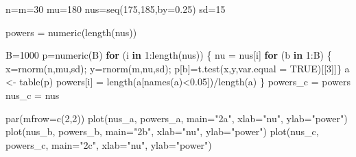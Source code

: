 \documentclass[
]{article}
\newenvironment{Shaded}{\begin{snugshade}}{\end{snugshade}}
\newcommand{\AttributeTok}[1]{\textcolor[rgb]{0.77,0.63,0.00}{#1}}
\newcommand{\ConstantTok}[1]{\textcolor[rgb]{0.00,0.00,0.00}{#1}}
\newcommand{\ControlFlowTok}[1]{\textcolor[rgb]{0.13,0.29,0.53}{\textbf{#1}}}
\newcommand{\DecValTok}[1]{\textcolor[rgb]{0.00,0.00,0.81}{#1}}
\newcommand{\FloatTok}[1]{\textcolor[rgb]{0.00,0.00,0.81}{#1}}
\newcommand{\FunctionTok}[1]{\textcolor[rgb]{0.00,0.00,0.00}{#1}}
\newcommand{\NormalTok}[1]{#1}
\newcommand{\OtherTok}[1]{\textcolor[rgb]{0.56,0.35,0.01}{#1}}
\newcommand{\SpecialCharTok}[1]{\textcolor[rgb]{0.00,0.00,0.00}{#1}}
\newcommand{\StringTok}[1]{\textcolor[rgb]{0.31,0.60,0.02}{#1}}
\begin{document}
\begin{Shaded}
\begin{Highlighting}[]
\NormalTok{n}\OtherTok{=}\NormalTok{m}\OtherTok{=}\DecValTok{30}
\NormalTok{mu}\OtherTok{=}\DecValTok{180}
\NormalTok{nus}\OtherTok{=}\FunctionTok{seq}\NormalTok{(}\DecValTok{175}\NormalTok{,}\DecValTok{185}\NormalTok{,}\AttributeTok{by=}\FloatTok{0.25}\NormalTok{)}
\NormalTok{sd}\OtherTok{=}\DecValTok{15}

\NormalTok{powers }\OtherTok{=} \FunctionTok{numeric}\NormalTok{(}\FunctionTok{length}\NormalTok{(nus))}

\NormalTok{B}\OtherTok{=}\DecValTok{1000}
\NormalTok{p}\OtherTok{=}\FunctionTok{numeric}\NormalTok{(B)}
\ControlFlowTok{for}\NormalTok{ (i }\ControlFlowTok{in} \DecValTok{1}\SpecialCharTok{:}\FunctionTok{length}\NormalTok{(nus)) \{}
\NormalTok{  nu }\OtherTok{=}\NormalTok{ nus[i]}
  \ControlFlowTok{for}\NormalTok{ (b }\ControlFlowTok{in} \DecValTok{1}\SpecialCharTok{:}\NormalTok{B) \{}
\NormalTok{    x}\OtherTok{=}\FunctionTok{rnorm}\NormalTok{(n,mu,sd);}
\NormalTok{    y}\OtherTok{=}\FunctionTok{rnorm}\NormalTok{(m,nu,sd);}
\NormalTok{    p[b]}\OtherTok{=}\FunctionTok{t.test}\NormalTok{(x,y,}\AttributeTok{var.equal =} \ConstantTok{TRUE}\NormalTok{)[[}\DecValTok{3}\NormalTok{]]\}}
\NormalTok{  a }\OtherTok{\textless{}{-}} \FunctionTok{table}\NormalTok{(p)}
\NormalTok{  powers[i] }\OtherTok{=} \FunctionTok{length}\NormalTok{(a[}\FunctionTok{names}\NormalTok{(a)}\SpecialCharTok{\textless{}}\FloatTok{0.05}\NormalTok{])}\SpecialCharTok{/}\FunctionTok{length}\NormalTok{(a)}
\NormalTok{\} }
\NormalTok{powers\_c }\OtherTok{=}\NormalTok{ powers}
\NormalTok{nus\_c }\OtherTok{=}\NormalTok{ nus}
\end{Highlighting}
\end{Shaded}

\begin{Shaded}
\begin{Highlighting}[]
\FunctionTok{par}\NormalTok{(}\AttributeTok{mfrow=}\FunctionTok{c}\NormalTok{(}\DecValTok{2}\NormalTok{,}\DecValTok{2}\NormalTok{))}
\FunctionTok{plot}\NormalTok{(nus\_a, powers\_a, }\AttributeTok{main=}\StringTok{"2a"}\NormalTok{, }\AttributeTok{xlab=}\StringTok{"nu"}\NormalTok{, }\AttributeTok{ylab=}\StringTok{"power"}\NormalTok{)}
\FunctionTok{plot}\NormalTok{(nus\_b, powers\_b, }\AttributeTok{main=}\StringTok{"2b"}\NormalTok{, }\AttributeTok{xlab=}\StringTok{"nu"}\NormalTok{, }\AttributeTok{ylab=}\StringTok{"power"}\NormalTok{)}
\FunctionTok{plot}\NormalTok{(nus\_c, powers\_c, }\AttributeTok{main=}\StringTok{"2c"}\NormalTok{, }\AttributeTok{xlab=}\StringTok{"nu"}\NormalTok{, }\AttributeTok{ylab=}\StringTok{"power"}\NormalTok{)}
\end{Highlighting}
\end{Shaded}
\end{document}
